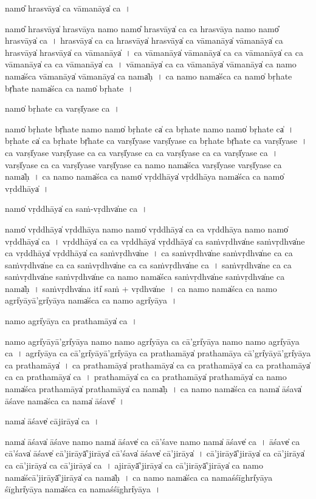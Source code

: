 \documentclass[parskip, DIV=14]{scrartcl}
\begin{document}
{namo̎ hra॒svāya̍ ca vāma॒nāya̍ ca॒~।

namo̎ hra॒svāya̍ hra॒svāya॒ namo॒ namo̎ hra॒svāya̍ ca ca hra॒svāya॒ namo॒ namo̎ hra॒svāya̍ ca~।
hra॒svāya̍ ca ca hra॒svāya̍ hra॒svāya̍ ca vāma॒nāya̍ vāma॒nāya̍ ca hra॒svāya̍ hra॒svāya̍ ca vāma॒nāya̍~।
ca॒ vā॒ma॒nāya̍ vāma॒nāya̍ ca ca vāma॒nāya̍ ca ca vāma॒nāya̍ ca ca vāma॒nāya̍ ca~।
vā॒ma॒nāya̍ ca ca vāma॒nāya̍ vāma॒nāya̍ ca॒ namo॒ nama̍śca vāma॒nāya̍ vāma॒nāya̍ ca॒ nama̍ḥ~।
ca॒ namo॒ nama̍śca ca॒ namo̍ bṛha॒te bṛ̍ha॒te nama̍śca ca॒ namo̍ bṛha॒te~।

namo̍ bṛha॒te ca॒ varṣī̍yase ca॒~।

namo̍ bṛha॒te bṛ̍ha॒te namo॒ namo̍ bṛha॒te ca̍ ca bṛha॒te namo॒ namo̍ bṛha॒te ca̍~।
bṛ॒ha॒te ca̍ ca bṛha॒te bṛ̍ha॒te ca॒ varṣī̍yase॒ varṣī̍yase ca bṛha॒te bṛ̍ha॒te ca॒ varṣī̍yase~।
ca॒ varṣī̍yase॒ varṣī̍yase ca ca॒ varṣī̍yase ca ca॒ varṣī̍yase ca ca॒ varṣī̍yase ca~।
varṣī̍yase ca ca॒  varṣī̍yase॒ varṣī̍yase ca॒ namo॒ nama̍śca॒ varṣī̍yase॒ varṣī̍yase ca॒ nama̍ḥ~।
ca॒ namo॒ nama̍śca ca॒ namo̍ vṛ॒ddhāya̍ vṛ॒ddhāya॒ nama̍śca ca॒ namo̍ vṛ॒ddhāya̍~।

namo̍ vṛ॒ddhāya̍ ca sa॒ṁ-vṛdhva̍ne ca~।

namo̍ vṛ॒ddhāya̍ vṛ॒ddhāya॒ namo॒ namo̍ vṛ॒ddhāya̍ ca ca vṛ॒ddhāya॒ namo॒ namo̍ vṛ॒ddhāya̍ ca~।
vṛ॒ddhāya̍ ca ca vṛ॒ddhāya̍ vṛ॒ddhāya̍ ca sa॒ṁvṛdhva̍ne sa॒ṁvṛdhva̍ne ca vṛ॒ddhāya̍ vṛ॒ddhāya̍ ca sa॒ṁvṛdhva̍ne~।
ca॒ sa॒ṁvṛdhva̍ne sa॒ṁvṛdhva̍ne ca ca sa॒ṁvṛdhva̍ne ca ca sa॒ṁvṛdhva̍ne ca ca sa॒ṁvṛdhva̍ne ca~।
sa॒ṁvṛdhva̍ne ca ca sa॒ṁvṛdhva̍ne sa॒ṁvṛdhva̍ne ca॒ namo॒ nama̍śca sa॒ṁvṛdhva̍ne sa॒ṁvṛdhva̍ne ca॒ nama̍ḥ~।
sa॒ṁvṛdhva̍na॒ iti̍ saṁ + vṛdhva̍ne~।
ca॒ namo॒ nama̍śca ca॒ namo॒ agri̍yā॒yā'gri̍yāya॒ nama̍śca ca॒ namo॒ agri̍yāya~।

namo॒ agri̍yāya ca pratha॒māya̍ ca॒~।

namo॒ agri̍yā॒yā'gri̍yāya॒ namo॒ namo॒ agri̍yāya ca॒ cā'gri̍yāya॒ namo॒ namo॒ agri̍yāya ca~।
agri̍yāya ca॒ cā'gri̍yā॒yā'gri̍yāya ca pratha॒māya̍ pratha॒māya॒ cā'gri̍yā॒yā'gri̍yāya ca pratha॒māya̍~।
ca॒ pra॒tha॒māya̍ pratha॒māya̍ ca ca pratha॒māya̍ ca ca pratha॒māya̍ ca ca pratha॒māya̍ ca~।
pra॒tha॒māya̍ ca ca pratha॒māya̍ pratha॒māya̍ ca॒ namo॒ nama̍śca pratha॒māya̍ pratha॒māya̍ ca॒ nama̍ḥ~।
ca॒ namo॒ nama̍śca ca॒ nama̍ ā॒śava̍ ā॒śave॒ nama̍śca ca॒ nama̍ ā॒śave̎~।


nama̍ ā॒śave̍ cāji॒rāya̍ ca॒~।  

nama̍ ā॒śava̍ ā॒śave॒ namo॒ nama̍ ā॒śave̍ ca cā॒'śave॒ namo॒ nama̍ ā॒śave̍ ca~।
ā॒śave̍ ca cā॒'śava̍ ā॒śave̍ cā'ji॒rāyā̍'ji॒rāya̍  cā॒'śava̍ ā॒śave̍ cā'ji॒rāya̍~।
cā॒'ji॒rāyā̍'ji॒rāya̍ ca cā'ji॒rāya̍ ca cā'ji॒rāya̍ ca cā'ji॒rāya̍ ca~।
a॒ji॒rāyā̍'ji॒rāya̍ ca cā'ji॒rāyā̍'ji॒rāya̍ ca॒ namo॒ nama̍ścā'ji॒rāyā̍'ji॒rāya̍ ca॒ nama̍ḥ~।
ca॒ namo॒ nama̍śca ca॒ nama॒śśīghri̍yāya॒ śīghri̍yāya॒ nama̍śca ca॒ nama॒śśīghri̍yāya~।

}
\end{document}
